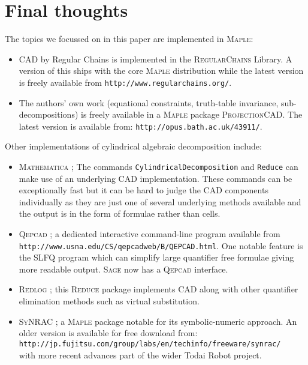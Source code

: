 \documentclass[runningheads,a4paper]{llncs}
\begin{document}
\section{Final thoughts}

The topics we focussed on in this paper are implemented in \textsc{Maple}: 
\begin{itemize}
\item CAD by Regular Chains is implemented in the \textsc{RegularChains} Library.  A version of this ships with the core \textsc{Maple} distribution while the latest version is freely available from \texttt{http://www.regularchains.org/}.  
\item The authors' own work (equational constraints, truth-table invariance, sub-decompositions) is freely available in a \textsc{Maple} package \textsc{ProjectionCAD}.  The latest version is available from: \texttt{http://opus.bath.ac.uk/43911/}.
\end{itemize}  

\noindent Other implementations of cylindrical algebraic decomposition include:
\begin{itemize}
\item \textsc{Mathematica} \cite{Strzebonski2006}; The commands \texttt{CylindricalDecomposition} and \texttt{Reduce} can make use of an underlying CAD implementation.  These commands can be exceptionally fast but it can be hard to judge the CAD components individually as they are just one of several underlying methods available and the output is in the form of formulae rather than cells.  
\item \textsc{Qepcad} \cite{Brown2003}; a dedicated interactive command-line program available from \texttt{http://www.usna.edu/CS/qepcadweb/B/QEPCAD.html}.  One notable feature is the SLFQ program which can simplify large quantifier free formulae giving more readable output.  \textsc{Sage} now has a \textsc{Qepcad} interface.
\item \textsc{Redlog} \cite{SS03}; this \textsc{Reduce} package implements CAD along with other quantifier elimination methods such as virtual substitution. 
\item \textsc{SyNRAC} \cite{IYAY13}; a \textsc{Maple} package notable for its symbolic-numeric approach.  An older version is available for free download from: \\ 
\texttt{http://jp.fujitsu.com/group/labs/en/techinfo/freeware/synrac/} \\
with more recent advances part of the wider Todai Robot project.
\end{itemize}
\end{document}
